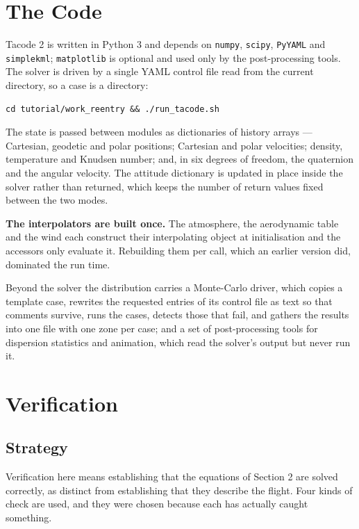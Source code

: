 \documentclass[11pt,a4paper]{article}
\begin{document}
\section{The Code}

Tacode 2 is written in Python 3 and depends on \texttt{numpy}, \texttt{scipy},
\texttt{PyYAML} and \texttt{simplekml}; \texttt{matplotlib} is optional and used only by
the post-processing tools. The solver is driven by a single YAML control file read from
the current directory, so a case is a directory:

\begin{lstlisting}
cd tutorial/work_reentry && ./run_tacode.sh
\end{lstlisting}

The state is passed between modules as dictionaries of history arrays --- Cartesian,
geodetic and polar positions; Cartesian and polar velocities; density, temperature and
Knudsen number; and, in six degrees of freedom, the quaternion and the angular velocity.
The attitude dictionary is updated in place inside the solver rather than returned, which
keeps the number of return values fixed between the two modes.

\textbf{The interpolators are built once.} The atmosphere, the aerodynamic table and the
wind each construct their interpolating object at initialisation and the accessors only
evaluate it. Rebuilding them per call, which an earlier version did, dominated the run
time.

Beyond the solver the distribution carries a Monte-Carlo driver, which copies a template
case, rewrites the requested entries of its control file as text so that comments survive,
runs the cases, detects those that fail, and gathers the results into one file with one
zone per case; and a set of post-processing tools for dispersion statistics and
animation, which read the solver's output but never run it.

\section{Verification} \label{verification}

\subsection{Strategy}

Verification here means establishing that the equations of Section 2 are solved correctly,
as distinct from establishing that they describe the flight. Four kinds of check are used,
and they were chosen because each has actually caught something.
\end{document}
